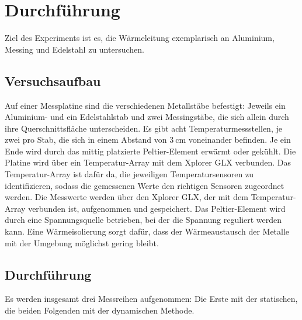 \section{Durchführung}
\label{sec:Durchführung}
Ziel des Experiments ist es, die Wärmeleitung exemplarisch an Aluminium, Messing und Edelstahl zu untersuchen. 
\subsection{Versuchsaufbau}
Auf einer Messplatine sind die verschiedenen Metallstäbe befestigt: 
Jeweils ein Aluminium- und ein Edelstahlstab und zwei Messingstäbe, die sich allein durch ihre Querschnittsfläche unterscheiden.
Es gibt acht Temperaturmessstellen, je zwei pro Stab, die sich in einem Abstand von $\SI{3}{\centi\meter}$ voneinander befinden. 
Je ein Ende wird durch das mittig platzierte Peltier-Element erwärmt oder gekühlt. 
Die Platine wird über ein Temperatur-Array mit dem Xplorer GLX verbunden. 
Das Temperatur-Array ist dafür da, die jeweiligen Temperatursensoren zu identifizieren, sodass die gemessenen Werte den richtigen Sensoren zugeordnet werden.
Die Messwerte werden über den Xplorer GLX, der mit dem Temperatur-Array verbunden ist, aufgenommen und gespeichert. 
Das Peltier-Element wird durch eine Spannungsquelle betrieben, bei der die Spannung reguliert werden kann. 
Eine Wärmeisolierung sorgt dafür, dass der Wärmeaustausch der Metalle mit der Umgebung möglichst gering bleibt.
\subsection{Durchführung}
Es werden insgesamt drei Messreihen aufgenommen: Die Erste mit der statischen, die beiden Folgenden mit der dynamischen Methode.
